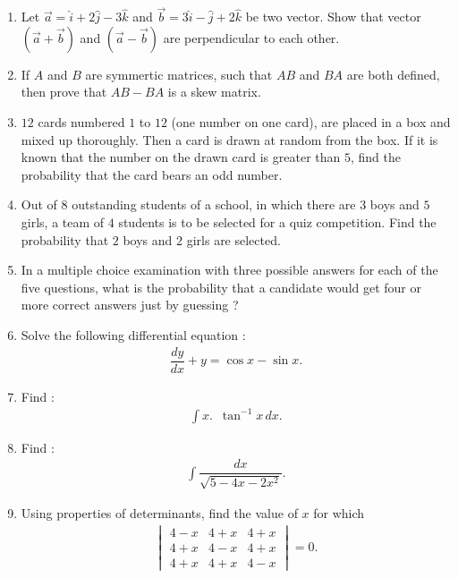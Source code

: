 \documentclass[12pt,-letter paper]{article}
\providecommand{\mydet}[1]{\ensuremath{\begin{vmatrix}#1\end{vmatrix}}}
\providecommand{\brak}[1]{\ensuremath{\left(#1\right)}}
\begin{document}
\begin{enumerate}
    \item Let $\overrightarrow{a}=\hat{i}+2\hat{j}-3\hat{k}$ and $\overrightarrow{b}=3\hat{i}-\hat{j}+2\hat{k}$ be two vector. Show that vector $\brak{\overrightarrow{a}+\overrightarrow{b}}$ and $\brak{\overrightarrow{a}-\overrightarrow{b}}$ are perpendicular to each other. 
    
    \item If $A$ and $B$ are symmertic matrices, such that $AB$ and $BA$ are both defined, then prove that $AB-BA$ is a skew matrix.

    \item $12$ cards numbered $1$ to $12$ (one number on one card), are placed in a box and mixed up thoroughly. Then a card is drawn at random from the box. If it is known that the number on the drawn card is greater than $5$, find the probability that the card bears an odd number.

    \item Out of $8$ outstanding students of a school, in which there are $3$ boys and $5$ girls, a team of $4$ students is to be selected for a quiz competition. Find the probability that $2$ boys and $2$ girls are selected.

    \item In a multiple choice examination with three possible answers for each of the five questions, what is the probability that a candidate would get four or more correct answers just by guessing ?

    \item Solve the following differential equation :
     \begin{align*}
         \dfrac{dy}{dx}+y=\cos{x} - \sin{x}.
     \end{align*}

     \item Find :
        \begin{align*}
            \int x.\hspace{6pt}\tan^{-1}{x} \,dx.
        \end{align*}

    \item Find :
        \begin{align*}
            \int \dfrac{dx}{\sqrt{5-4x-2x^2}}.
        \end{align*}

    \item Using properties of determinants, find the value of $x$ for which
    \begin{align*}
        \mydet{4-x&4+x&4+x\\4+x&4-x&4+x\\4+x&4+x&4-x}=0.
    \end{align*}


\end{enumerate}
\end{document}
